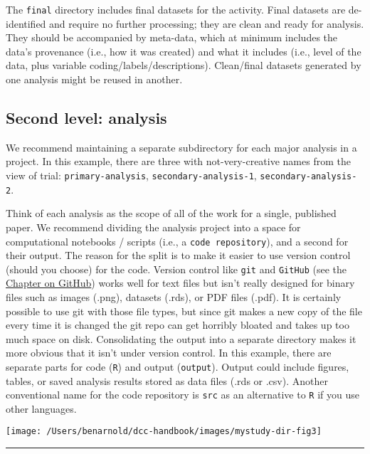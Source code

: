 \documentclass[
]{book}
\begin{document}
The \texttt{final} directory includes final datasets for the activity. Final datasets are de-identified and require no further processing; they are clean and ready for analysis. They should be accompanied by meta-data, which at minimum includes the data's provenance (i.e., how it was created) and what it includes (i.e., level of the data, plus variable coding/labels/descriptions). Clean/final datasets generated by one analysis might be reused in another.

\hypertarget{second-level-analysis}{%
\subsection{Second level: analysis}\label{second-level-analysis}}

We recommend maintaining a separate subdirectory for each major analysis in a project. In this example, there are three with not-very-creative names from the view of trial: \texttt{primary-analysis}, \texttt{secondary-analysis-1}, \texttt{secondary-analysis-2}.

Think of each analysis as the scope of all of the work for a single, published paper. We recommend dividing the analysis project into a space for computational notebooks / scripts (i.e., a \texttt{code\ repository}), and a second for their output. The reason for the split is to make it easier to use version control (should you choose) for the code. Version control like \texttt{git} and \texttt{GitHub} (see the \protect\hyperlink{GitHub}{Chapter on GitHub}) works well for text files but isn't really designed for binary files such as images (.png), datasets (.rds), or PDF files (.pdf). It is certainly possible to use git with those file types, but since git makes a new copy of the file every time it is changed the git repo can get horribly bloated and takes up too much space on disk. Consolidating the output into a separate directory makes it more obvious that it isn't under version control. In this example, there are separate parts for code (\texttt{R}) and output (\texttt{output}). Output could include figures, tables, or saved analysis results stored as data files (.rds or .csv). Another conventional name for the code repository is \texttt{src} as an alternative to \texttt{R} if you use other languages.

\texttt{[image: /Users/benarnold/dcc-handbook/images/mystudy-dir-fig3]}

\begin{center}\rule{0.5\linewidth}{\linethickness}\end{center}
\end{document}
